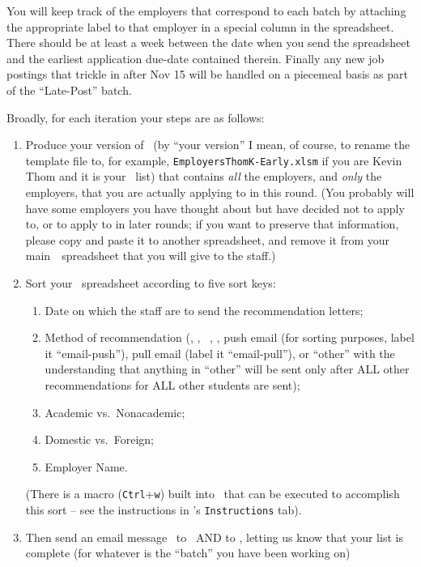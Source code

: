 \documentclass{\econtex}
\begin{document}
You will keep track of the employers that correspond to each batch 
by attaching the appropriate label to that employer in a special
column in the spreadsheet.  There should be at 
least a week between the date when you send the spreadsheet and the
earliest application due-date contained therein.  Finally any new job postings
that trickle in after Nov 15 will be handled on a piecemeal basis
as part of the ``Late-Post'' batch.

Broadly, for each iteration your steps are as follows:
\begin{enumerate}
\item Produce your version of \EMtt~(by ``your version'' I mean, of
  course, to rename the template file to, for example,
  \texttt{EmployersThomK-Early.xlsm} if you are Kevin Thom and it is
  your \Early~list) that contains \textit{all} the employers, and \textit{only} the employers, that you are actually applying to in this
  round.  (You probably will have some employers you have thought
  about but have decided not to apply to, or to apply to in later rounds; if you want to preserve that
  information, please copy and paste it to another spreadsheet, and
  remove it from your main~{\EMW}~spreadsheet that you will give to the
  staff.)

  
\item Sort your \EMtt~spreadsheet according to five sort keys:
  \begin{enumerate} 
  \item Date on which the staff are to send the recommendation letters; 
  \item Method of recommendation (\AEA, \AJO, {\EJM}~, \Interfolio, push email (for sorting purposes,
    label it ``email-push''), pull email (label it ``email-pull''), or
    ``other'' with the understanding that anything in ``other'' will be
    sent only after ALL other recommendations for ALL other students are
    sent);
  \item Academic vs.\ Nonacademic;
  \item Domestic vs.\ Foreign;
  \item Employer Name. 
  \end{enumerate} 

  (There is a macro (\texttt{Ctrl}+\texttt{w}) built into \EMtt~that can be
  executed to accomplish this sort -- see the instructions in
  \EMtt's \texttt{Instructions} tab).


\item Then send an email message {\EMtt}~to {\jmstaffemail}~AND to {\JMPOEmail}, letting us know that your list is complete (for whatever is the ``batch'' you have been working on)


\end{enumerate}
\end{document}
